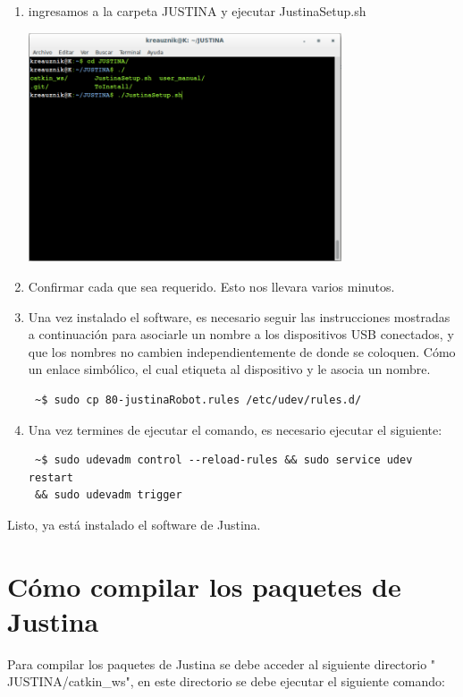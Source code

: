 \documentclass[user_manual.tex]{subfiles}
\begin{document}
\begin{enumerate}
 \item ingresamos a la carpeta JUSTINA y ejecutar JustinaSetup.sh
  \begin{center}
\includegraphics[width=0.73\textwidth]{Figures/PP/pp4.png}
\end{center}
 \item Confirmar cada que sea requerido. Esto nos llevara varios minutos.
 \item Una vez instalado el software, es necesario seguir las instrucciones mostradas a continuación para asociarle un nombre a los dispositivos USB conectados, y que los nombres no cambien independientemente de donde se coloquen. Cómo un enlace simbólico, el cual etiqueta al dispositivo y le asocia un nombre.

\begin{verbatim}
 ~$ sudo cp 80-justinaRobot.rules /etc/udev/rules.d/
\end{verbatim}
 
 \item Una vez termines de ejecutar el comando, es necesario ejecutar el siguiente: 
 
\begin{verbatim}
 ~$ sudo udevadm control --reload-rules && sudo service udev restart 
 && sudo udevadm trigger
\end{verbatim}

 
\end{enumerate}
Listo, ya está instalado el software de Justina.

\section{Cómo compilar los paquetes de Justina}
Para compilar los paquetes de Justina se debe acceder al siguiente directorio " JUSTINA/catkin\_ws", en este directorio se debe ejecutar el siguiente comando: 
\end{document}
